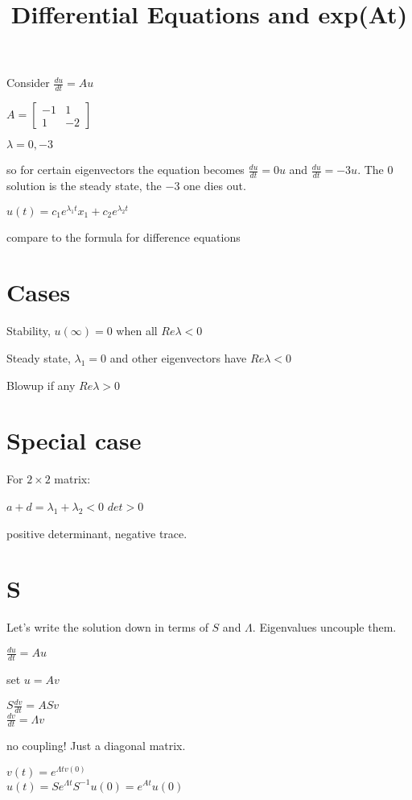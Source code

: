 \documentclass{article}
\title{Differential Equations and exp(At)}
\date{}
\begin{document}
\maketitle

Consider $\frac{du}{dt} = Au$

$A = \begin{bmatrix}
-1 & 1 \\
1 & -2
\end{bmatrix}$

$\lambda = 0,-3$

so for certain eigenvectors the equation becomes $\frac{du}{dt} = 0u$ and $\frac{du}{dt} = -3u$. The $0$ solution is the steady state, the $-3$ one dies out.

$u(t) = c_1 e^{\lambda_1 t}x_1 + c_2 e^{\lambda_2 t}$

compare to the formula for difference equations

\section{Cases}

Stability, $u(\infty) = 0$ when all $Re \lambda < 0$

Steady state, $\lambda_1 = 0$ and other eigenvectors have $Re \lambda < 0$

Blowup if any $Re \lambda > 0$

\section{Special case}

For $2 \times 2$ matrix:

$a + d = \lambda_1 + \lambda_2 < 0$
$det > 0$

positive determinant, negative trace.

\section{S}

Let's write the solution down in terms of $S$ and $\Lambda$. Eigenvalues uncouple them.

$\frac{du}{dt} = Au$

set $u = Av$

$S \frac{dv}{dt} = ASv$ \\
$\frac{dv}{dt} = \Lambda v$

no coupling! Just a diagonal matrix.

$v(t) = e^{\Lambda t v(0)}$ \\
$u(t) = S e^{\Lambda t} S^{-1} u(0) = e^{At} u(0)$
\end{document}
